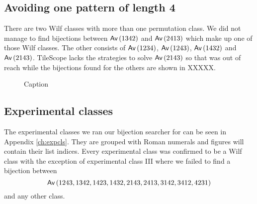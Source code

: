 \subsection{Avoiding one pattern of length 4}
There are two Wilf classes with more than one permutation class. We did not manage to find bijections between $\textsf{Av}\left(1342\right)$ and $\textsf{Av}\left(2413\right)$ which make up one of those Wilf classes. The other consists of $\textsf{Av}\left(1234\right)$, $\textsf{Av}\left(1243\right)$, $\textsf{Av}\left(1432\right)$ and $\textsf{Av}\left(2143\right)$. TileScope lacks the strategies to solve $\textsf{Av}\left(2143\right)$ so that was out of reach while the bijections found for the others are shown in XXXXX.

\begin{figure}[ht!]
    \centering
    \caption{Caption}
    \label{fig:1x4bi}
\end{figure}

\subsection{Experimental classes}
The experimental classes we ran our bijection searcher for can be seen in Appendix \ref{ch:expcls}. They are grouped with Roman numerals and figures will contain their list indices. Every experimental class was confirmed to be a Wilf class with the exception of experimental class III where we failed to find a bijection between
\[
    \textsf{Av}\left(1243,1342,1423,1432,2143,2413,3142,3412,4231\right)
\]
and any other class.


